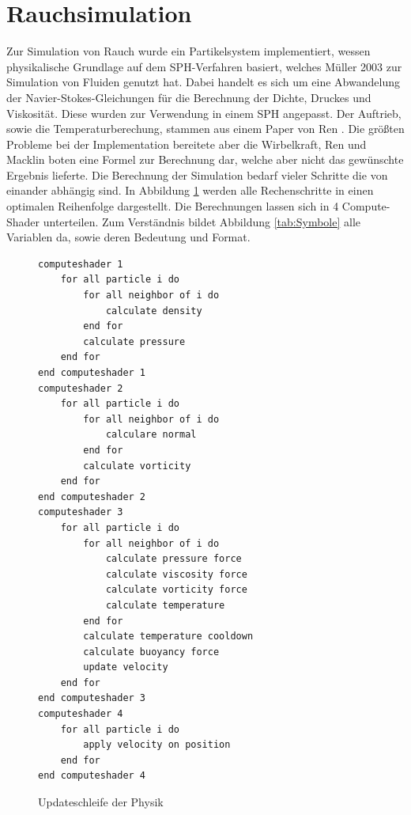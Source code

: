 \documentclass[intern,palatino]{cgBA}
\begin{document}

\section{Rauchsimulation}\label{rauch}

Zur Simulation von Rauch wurde ein Partikelsystem implementiert, wessen physikalische Grundlage auf dem SPH-Verfahren basiert, welches Müller \cite{muller2003particle} 2003 zur Simulation von Fluiden genutzt hat. Dabei handelt es sich um eine Abwandelung der Navier-Stokes-Gleichungen für die Berechnung der Dichte, Druckes und Viskosität. Diese wurden zur Verwendung in einem SPH angepasst. Der Auftrieb, sowie die Temperaturberechung, stammen aus einem Paper von Ren \cite{ren2016fast}. Die größten Probleme bei der Implementation bereitete aber die Wirbelkraft, Ren und Macklin \cite{macklin2014unified} boten eine Formel zur Berechnung dar, welche aber nicht das gewünschte Ergebnis lieferte.
\newline
Die Berechnung der Simulation bedarf vieler Schritte die von einander abhängig sind. In Abbildung  \ref{code:sim} werden alle Rechenschritte in einen optimalen Reihenfolge dargestellt. Die Berechnungen lassen sich in 4 Compute-Shader unterteilen.
\newline
Zum Verständnis bildet Abbildung \ref{tab:Symbole} alle Variablen da, sowie deren Bedeutung und Format.


\begin{figure}
	\centering
	\begin{lstlisting}
computeshader 1	
	for all particle i do
		for all neighbor of i do
			calculate density
		end for
		calculate pressure
	end for
end computeshader 1
computeshader 2
	for all particle i do
		for all neighbor of i do
			calculare normal
		end for
		calculate vorticity
	end for
end computeshader 2
computeshader 3
	for all particle i do
		for all neighbor of i do
			calculate pressure force
			calculate viscosity force
			calculate vorticity force
			calculate temperature
		end for
		calculate temperature cooldown
		calculate buoyancy force
		update velocity
	end for
end computeshader 3
computeshader 4
	for all particle i do
		apply velocity on position
	end for
end computeshader 4
	\end{lstlisting}
	\caption{Updateschleife der Physik}
	\label{code:sim}
\end{figure}
\end{document}

